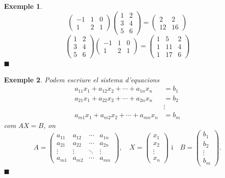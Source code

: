 \documentclass[
  11pt,
]{book}
\numberwithin{dummy}{section}
\theoremstyle{maincolornumbox}
\theoremstyle{blacknumex}
\newtheorem{exampleT}{Exemple}[chapter]
\theoremstyle{blacknumbox}
\theoremstyle{maincolornum}
\newenvironment{example}{\begin{exampleT}}{\hfill{\tiny\ensuremath{\blacksquare}}\end{exampleT}}
\begin{document}
\begin{example}
\protect\hypertarget{exm:prodmat}{}\label{exm:prodmat}\[\begin{pmatrix} -1 & 1 & 0 \\ 1 & 2 & 1 \end{pmatrix}
    \begin{pmatrix} 1 & 2 \\ 3 & 4 \\ 5 & 6 \end{pmatrix}
    =   \begin{pmatrix} 2 & 2 \\ 12 & 16 \end{pmatrix}\]
\[\begin{pmatrix} 1 & 2 \\ 3 & 4 \\ 5 & 6 \end{pmatrix}
    \begin{pmatrix} -1 & 1 & 0 \\ 1 & 2 & 1 \end{pmatrix}
    =   \begin{pmatrix} 1 & 5 & 2 \\ 1 & 11 & 4 \\ 1 & 17 & 6 \end{pmatrix}\]
\end{example}

\begin{example}
Podem escriure el sistema d'equacions \begin{align*}
    a_{11}x_1+a_{12}x_2+ \cdots + a_{1n}x_n &= b_1 \\
    a_{21}x_1+a_{22}x_2+ \cdots + a_{2n}x_n &= b_2 \\
    &\vdots \\
    a_{m1}x_1+a_{m2}x_2+ \cdots + a_{mn}x_n &= b_m
\end{align*} com \(AX=B\), on \[A=
    \begin{pmatrix}
    a_{11} & a_{12} & \cdots & a_{1n} \\
    a_{21} & a_{22} & \cdots & a_{2n} \\
    \vdots & \vdots & \ddots & \vdots \\
    a_{m1} & a_{m2} & \cdots & a_{mn} 
    \end{pmatrix},\quad
    X=
    \begin{pmatrix}
    x_1 \\ x_2 \\ \vdots \\ x_n
    \end{pmatrix} \text{ i}\quad
    B=
    \begin{pmatrix}
    b_1 \\ b_2 \\ \vdots \\ b_m
    \end{pmatrix}.\]
\end{example}
\end{document}
